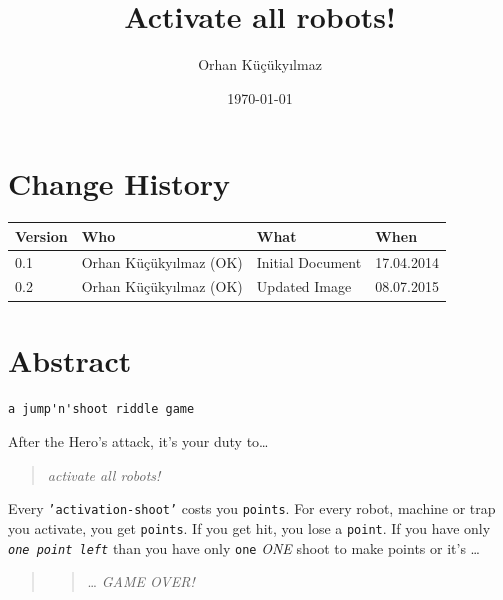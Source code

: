 \documentclass[twopages]{scrartcl}
\begin{document}
\title{Activate all robots!}
\author{Orhan Küçükyılmaz}
\date{\today}
\maketitle
\newpage
\tableofcontents

\section*{Change History}

\begin{longtable}{|l|l|l|l|}
\hline
Version & Who & What & When\\
\hline
0.1 & Orhan Küçükyılmaz (OK) & Initial Document & 17.04.2014\\
0.2 & Orhan Küçükyılmaz (OK) & Updated Image & 08.07.2015\\
\hline
\end{longtable}

\section*{Abstract}

\begin{verbatim}a jump'n'shoot riddle game
\end{verbatim}

After the Hero's attack, it's your duty to\ldots{}

\begin{quote}
\emph{activate all robots!}
\end{quote}

Every \texttt{'activation-shoot'} costs you \texttt{points}.\newline
For every robot, machine or trap you activate,\newline
you get \texttt{points}.\newline
If you get hit, you lose a \texttt{point}.\newline
If you have only \emph{\texttt{one point left}}\newline
than you have only \texttt{one} \emph{ONE} shoot to make points or it's \ldots{}

\begin{quote}
\begin{quote}
\ldots{} \emph{GAME OVER!}
\end{quote}
\end{quote}
\end{document}
